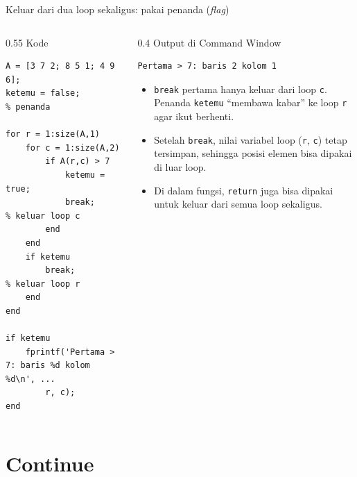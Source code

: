 \documentclass[aspectratio=169,10pt]{beamer}
\newcommand{\codesize}{\footnotesize}
\newcommand{\kode}[1]{\texttt{#1}}
\newcommand{\labelkode}{{\scriptsize\color{black!60}Kode}}
\newcommand{\labelout}{{\scriptsize\color{alertc}Output di Command Window}}
\begin{document}
\begin{frame}[fragile]{Keluar dari dua loop sekaligus: pakai penanda (\textit{flag})}
  \renewcommand{\codesize}{\scriptsize}
  \begin{columns}[T]
    \begin{column}{0.55\textwidth}
      \labelkode
\begin{lstlisting}
A = [3 7 2; 8 5 1; 4 9 6];
ketemu = false;               % penanda

for r = 1:size(A,1)
    for c = 1:size(A,2)
        if A(r,c) > 7
            ketemu = true;
            break;            % keluar loop c
        end
    end
    if ketemu
        break;                % keluar loop r
    end
end

if ketemu
    fprintf('Pertama > 7: baris %d kolom %d\n', ...
        r, c);
end
\end{lstlisting}
    \end{column}
    \begin{column}{0.4\textwidth}
      \labelout
\begin{lstlisting}[style=out]
Pertama > 7: baris 2 kolom 1
\end{lstlisting}
      \vspace{4pt}
      \footnotesize
      \begin{itemize}
        \item \kode{break} pertama hanya keluar dari loop \kode{c}. Penanda \kode{ketemu} ``membawa kabar''
              ke loop \kode{r} agar ikut berhenti.
        \item Setelah \kode{break}, nilai variabel loop (\kode{r}, \kode{c}) \alert{tetap tersimpan}, sehingga
              posisi elemen bisa dipakai di luar loop.
        \item Di dalam fungsi, \kode{return} juga bisa dipakai untuk keluar dari semua loop sekaligus.
      \end{itemize}
    \end{column}
  \end{columns}
\end{frame}

\section{Continue}
\end{document}
